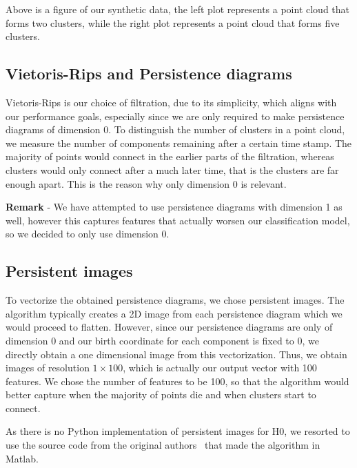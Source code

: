 \documentclass{article}
\begin{document}
Above is a figure of our synthetic data, the left plot represents a point cloud that forms two clusters, while the right plot represents a point cloud that forms five clusters.


\subsection{Vietoris-Rips and Persistence diagrams}
Vietoris-Rips is our choice of filtration, due to its simplicity, which aligns with our performance goals, especially since we are only required to make persistence diagrams of dimension 0. To distinguish the number of clusters in a point cloud, we measure the number of components remaining after a certain time stamp. The majority of points would connect in the earlier parts of the filtration, whereas clusters would only connect after a much later time, that is the clusters are far enough apart. This is the reason why only dimension 0 is relevant.

\textbf{Remark} - We have attempted to use persistence diagrams with dimension 1 as well, however this captures features that actually worsen our classification model, so we decided to only use dimension 0.


\subsection{Persistent images}
To vectorize the obtained persistence diagrams, we chose persistent images. The algorithm typically creates a 2D image from each persistence diagram which we would proceed to flatten. However, since our persistence diagrams are only of dimension 0 and our birth coordinate for each component is fixed to 0, we directly obtain a one dimensional image from this vectorization. Thus, we obtain images of resolution $1 \times 100$, which is actually our output vector with 100 features. We chose the number of features to be 100, so that the algorithm would better capture when the majority of points die and when clusters start to connect.

As there is no Python implementation of persistent images for H0, we resorted to use the source code from the original authors~\cite{PIarticle} that made the algorithm in Matlab.
\end{document}
